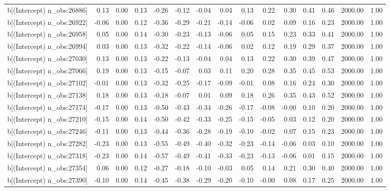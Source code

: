 \begin{table}[ht]
\begin{tabular}{rrrrrrrrrrrrrrr}
  b[(Intercept) n\_obs:26886] & 0.13 & 0.00 & 0.13 & -0.26 & -0.12 & -0.04 & 0.04 & 0.13 & 0.22 & 0.30 & 0.41 & 0.46 & 2000.00 & 1.00 \\ 
  b[(Intercept) n\_obs:26922] & -0.06 & 0.00 & 0.12 & -0.36 & -0.29 & -0.21 & -0.14 & -0.06 & 0.02 & 0.09 & 0.16 & 0.23 & 2000.00 & 1.00 \\ 
  b[(Intercept) n\_obs:26958] & 0.05 & 0.00 & 0.14 & -0.30 & -0.23 & -0.13 & -0.06 & 0.05 & 0.15 & 0.23 & 0.33 & 0.41 & 2000.00 & 1.00 \\ 
  b[(Intercept) n\_obs:26994] & 0.03 & 0.00 & 0.13 & -0.32 & -0.22 & -0.14 & -0.06 & 0.02 & 0.12 & 0.19 & 0.29 & 0.37 & 2000.00 & 1.00 \\ 
  b[(Intercept) n\_obs:27030] & 0.13 & 0.00 & 0.13 & -0.22 & -0.13 & -0.04 & 0.04 & 0.13 & 0.22 & 0.30 & 0.39 & 0.47 & 2000.00 & 1.00 \\ 
  b[(Intercept) n\_obs:27066] & 0.19 & 0.00 & 0.13 & -0.15 & -0.07 & 0.03 & 0.11 & 0.20 & 0.28 & 0.35 & 0.45 & 0.53 & 2000.00 & 1.00 \\ 
  b[(Intercept) n\_obs:27102] & -0.01 & 0.00 & 0.13 & -0.32 & -0.25 & -0.17 & -0.09 & -0.01 & 0.08 & 0.16 & 0.24 & 0.30 & 2000.00 & 1.00 \\ 
  b[(Intercept) n\_obs:27138] & 0.18 & 0.00 & 0.13 & -0.18 & -0.07 & 0.01 & 0.09 & 0.18 & 0.26 & 0.35 & 0.43 & 0.52 & 2000.00 & 1.00 \\ 
  b[(Intercept) n\_obs:27174] & -0.17 & 0.00 & 0.13 & -0.50 & -0.43 & -0.34 & -0.26 & -0.17 & -0.08 & -0.00 & 0.10 & 0.20 & 2000.00 & 1.00 \\ 
  b[(Intercept) n\_obs:27210] & -0.15 & 0.00 & 0.14 & -0.50 & -0.42 & -0.33 & -0.25 & -0.15 & -0.05 & 0.03 & 0.12 & 0.20 & 2000.00 & 1.00 \\ 
  b[(Intercept) n\_obs:27246] & -0.11 & 0.00 & 0.13 & -0.44 & -0.36 & -0.28 & -0.19 & -0.10 & -0.02 & 0.07 & 0.15 & 0.23 & 2000.00 & 1.00 \\ 
  b[(Intercept) n\_obs:27282] & -0.23 & 0.00 & 0.13 & -0.55 & -0.49 & -0.40 & -0.32 & -0.23 & -0.14 & -0.06 & 0.03 & 0.10 & 2000.00 & 1.00 \\ 
  b[(Intercept) n\_obs:27318] & -0.23 & 0.00 & 0.14 & -0.57 & -0.49 & -0.41 & -0.33 & -0.23 & -0.13 & -0.06 & 0.01 & 0.15 & 2000.00 & 1.00 \\ 
  b[(Intercept) n\_obs:27354] & 0.06 & 0.00 & 0.12 & -0.27 & -0.18 & -0.10 & -0.03 & 0.05 & 0.14 & 0.21 & 0.30 & 0.40 & 2000.00 & 1.00 \\ 
  b[(Intercept) n\_obs:27390] & -0.10 & 0.00 & 0.14 & -0.45 & -0.38 & -0.29 & -0.20 & -0.10 & -0.00 & 0.08 & 0.17 & 0.25 & 2000.00 & 1.00 \\ 

\end{tabular}
\end{table}
